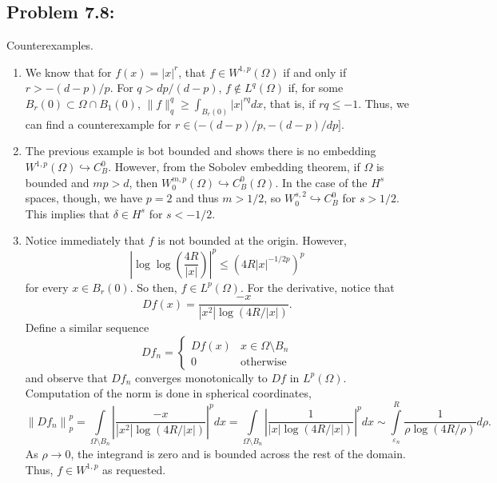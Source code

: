 \documentclass[letterpaper,twoside,11pt]{article}
\theoremstyle{mystyle}
\begin{document}
\subsection*{Problem 7.8:} Counterexamples. 
\begin{enumerate}
  \item We know that for $f(x) = |x|^r$, that $f \in W^{1,p}\left( \Omega \right)$ if and only if $r > -\left( d-p \right)/p$. For $q > dp/(d-p)$, $f \notin L^q \left( \Omega \right)$ if, for some $B_r(0) \subset \Omega \cap B_1(0)$, $\|f\|_q^q \geq \int_{B_r(0)} |x|^{rq}dx$, that is, if $rq \leq -1$. Thus, we can find a counterexample for $r \in ( -(d-p)/p, -(d-p)/dp ]$. 
  \item The previous example is bot bounded and shows there is no embedding $W^{1,p}\left( \Omega \right)\hookrightarrow C_B^0$. However, from the Sobolev embedding theorem, if $\Omega$ is bounded and $mp>d$, then $W^{m,p}_0\left( \Omega \right)\hookrightarrow C^0_B\left( \Omega \right)$. In the case of the $H^s$ spaces, though, we have $p=2$ and thus $m>1/2$, so $W^{s,2}_0 \hookrightarrow C^0_B$ for $s > 1/2$. This implies that $\delta \in H^s$ for $s < -1/2$. 
  \item Notice immediately that $f$ is not bounded at the origin. However, 
  \[{\left| {\log \log \left( {\frac{{4R}}{{\left| x \right|}}} \right)} \right|^p} \leqslant {\left( {4R{{\left| x \right|}^{ - 1/2p}}} \right)^p}\] for every $ x\in B_r(0)$. So then, $f \in L^p\left( \Omega \right)$. For the derivative, notice that 
  \[Df\left( x \right) = \frac{{ - x}}{{\left| {{x^2}} \right|\log \left( {4R/\left| x \right|} \right)}}.\]
  Define a similar sequence 
  \[D{f_n} = \left\{ {\begin{array}{*{20}{c}}
    {Df\left( x \right)}&{x \in \Omega  \setminus {B_n}} \\ 
    0&\text{otherwise} 
  \end{array}} \right.\]
  and observe that $Df_n$ converges monotonically to $Df$ in $L^p\left( \Omega \right)$. Computation of the norm is done in spherical coordinates, 
  \[\left\| {D{f_n}} \right\|_p^p = \int\limits_{\Omega  \setminus {B_n}} {{{\left| {\frac{{ - x}}{{\left| {{x^2}} \right|\log \left( {4R/\left| x \right|} \right)}}} \right|}^p}dx}  = \int\limits_{\Omega  \setminus {B_n}} {{{\left| {\frac{1}{{\left| x \right|\log \left( {4R/\left| x \right|} \right)}}} \right|}^p}dx} \sim \int\limits_{{\varepsilon _n}}^R {\frac{1}{{\rho \log \left( {4R/\rho } \right)}}d\rho } .\]
  As $\rho\to0$, the integrand is zero and is bounded across the rest of the domain. Thus, $f \in W^{1,p}$ as requested. 

\end{enumerate}
\end{document}
